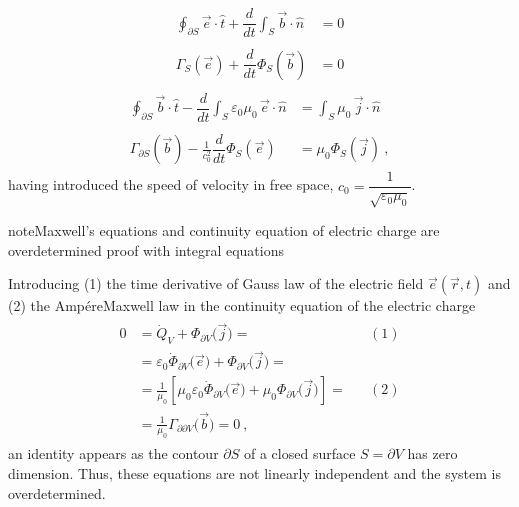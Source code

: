 \documentclass[letterpaper,10pt,english]{jupyterBook}
\begin{document}
\sphinxAtStartPar
{}
\begin{equation*}
\begin{split}\begin{aligned}
    \oint_{\partial S} \vec{e} \cdot \hat{t} + \dfrac{d}{dt} \int_{S} \vec{b} \cdot \hat{n} & = 0 \\  \\
    \Gamma_{S} \left( \vec{e} \right) + \dfrac{d}{dt} \Phi_{S} \left( \vec{b} \right) & = 0
\end{aligned}\end{split}
\end{equation*}
\sphinxAtStartPar
{}
\begin{equation*}
\begin{split}\begin{aligned}
    \oint_{\partial S} \vec{b} \cdot \hat{t} - \dfrac{d}{dt} \int_{S} \varepsilon_0 \mu_0 \, \vec{e} \cdot \hat{n} & = \int_{S} \mu_0 \, \vec{j} \cdot \hat{n} \\ \\
    \Gamma_{\partial S} \left( \vec{b} \right) - \frac{1}{c_0^2} \dfrac{d}{dt} \Phi_{S} \left( \vec{e} \right) & = \mu_0 \Phi_{S} \left( \vec{j} \right) \ ,
\end{aligned}\end{split}
\end{equation*}
\sphinxAtStartPar
having introduced the speed of velocity in free space, \(c_0 = \dfrac{1}{\sqrt{\varepsilon_0 \mu_0}}\).

\begin{sphinxadmonition}{note}{Maxwell’s equations and continuity equation of electric charge are overdetermined \sphinxhyphen{} proof with integral equations}

\sphinxAtStartPar
Introducing (1) the time derivative of Gauss law of the electric field \(\vec{e}(\vec{r},t)\) and (2) the Ampére\sphinxhyphen{}Maxwell law in the continuity equation of the electric charge
\begin{equation*}
\begin{split}\begin{aligned}
  0 & = \dot{Q}_V + \Phi_{\partial V}\big( \vec{j} \big) = && (1) \\
    & = \varepsilon_0 \dot{\Phi}_{\partial V}\big( \vec{e} \big) + \Phi_{\partial V}\big( \vec{j} \big) =\\
    & = \frac{1}{\mu_0} \left[ \mu_0 \varepsilon_0 \dot{\Phi}_{\partial V}\big( \vec{e} \big) + \mu_0 \Phi_{\partial V}\big( \vec{j} \big)\right] =  && (2) \\
    & = \frac{1}{\mu_0} \Gamma_{\partial \partial V} \big( \vec{b} \big) = 0 \ ,
\end{aligned}\end{split}
\end{equation*}
\sphinxAtStartPar
an identity appears as the contour \(\partial S\) of a closed surface \(S = \partial V\) has zero dimension. Thus, these equations are not linearly independent and the system is over\sphinxhyphen{}determined.
\end{sphinxadmonition}
\end{document}
